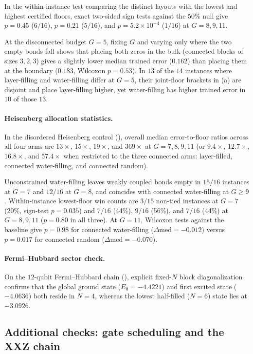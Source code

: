\documentclass[reprint,aps,pra,floatfix,superscriptaddress,nofootinbib,longbibliography]{revtex4-2}
\theoremstyle{remark}
\theoremstyle{definition}
\begin{document}
In the within-instance test comparing the distinct layouts with the lowest and highest
certified floors, exact two-sided sign tests against the $50\%$ null give
$p=0.45$ ($6/16$), $p=0.21$ ($5/16$), and $p=5.2\times10^{-4}$ ($1/16$) at
$G=8,9,11$.

At the disconnected budget $G=5$, fixing $G$ and varying only where
the two empty bonds fall shows that placing both zeros in the bulk (connected
blocks of sizes $3,2,3$) gives a slightly lower median trained error ($0.162$)
than placing them at the boundary ($0.183$, Wilcoxon $p=0.53$). In $13$ of the $14$ instances where layer-filling and water-filling differ at
$G=5$, their joint-floor brackets in (a) are disjoint and place
layer-filling higher, yet water-filling has higher trained error in $10$ of
those $13$.

\paragraph{Heisenberg allocation statistics.}
In the disordered Heisenberg control (), overall median
error-to-floor ratios across all four arms are $13\times$, $15\times$,
$19\times$, and $369\times$ at $G=7,8,9,11$ (or $9.4\times$, $12.7\times$,
$16.8\times$, and $57.4\times$ when restricted to the three connected arms:
layer-filled, connected water-filling, and connected random).

Unconstrained water-filling leaves weakly coupled bonds empty in $15/16$ instances at $G=7$
and $12/16$ at $G=8$, and coincides with connected water-filling at $G\ge9$.
Within-instance lowest-floor win counts are $3/15$ non-tied instances at $G=7$
(20\%, sign-test $p=0.035$) and $7/16$ (44\%), $9/16$ (56\%), and $7/16$ (44\%)
at $G=8,9,11$ ($p=0.80$ in all three). At $G=11$, Wilcoxon tests against the
baseline give $p=0.98$ for connected water-filling ($\Delta\mathrm{med}=-0.012$)
versus $p=0.017$ for connected random ($\Delta\mathrm{med}=-0.070$).

\paragraph{Fermi--Hubbard sector check.}
On the $12$-qubit Fermi--Hubbard chain (), explicit fixed-$N$
block diagonalization confirms that the global ground state ($E_0=-4.4221$) and
first excited state ($-4.0636$) both reside in $N=4$, whereas the lowest
half-filled ($N=6$) state lies at $-3.0926$.

\subsection{Additional checks: gate scheduling and the XXZ chain}
\label{app:checks}
\end{document}
